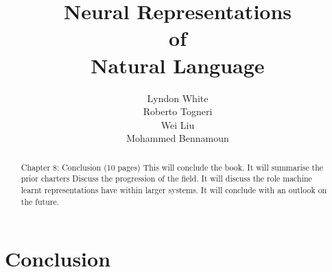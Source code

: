 \documentclass[12pt,parskip]{komatufte}
\begin{document}
\title{Neural Representations \\of\\ Natural Language}
\author{Lyndon White\\ Roberto Togneri\\ Wei Liu\\ Mohammed Bennamoun}
\publishers{SpringerBriefs in Computer Science}


\maketitle
{}

\tableofcontents





















\chapter{Conclusion}\label{sec:conclusion}
\begin{abstract}
Chapter 8: Conclusion (10 pages)
This will conclude the book. 
It will summarise the prior charters
Discuss the progression of the field.
It will discuss the role machine learnt representations have within larger systems.
It will conclude with an outlook on the future.
\end{abstract}


\clearpage
{}
\printbibliography
\end{document}
